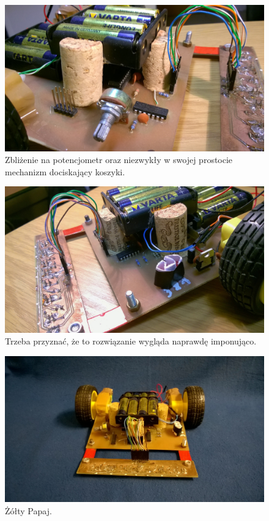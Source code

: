 \documentclass{article}
\begin{document}
\begin{figure}[!htbp]
\centering
\includegraphics[scale=0.24]{./focie/bok_prawy.jpg}
\caption{Zbliżenie na potencjometr oraz niezwykły w swojej prostocie mechanizm dociskający koszyki.}
\end{figure}

\begin{figure}[!htbp]
\centering
\includegraphics[scale=0.24]{./focie/bok_lewy.jpg}
\caption{Trzeba przyznać, że to rozwiązanie wygląda naprawdę imponująco.}
\end{figure}

\begin{figure}[!htbp]
\centering
\includegraphics[scale=0.24]{./focie/zolty_papaj.jpg}
\caption{Żółty Papaj.}
\end{figure}

\newpage


\end{document}
